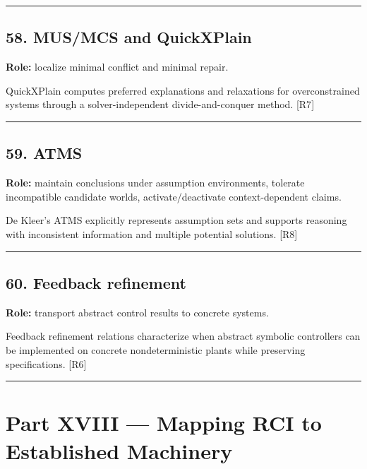 \documentclass[
]{article}
\begin{document}
\begin{center}\rule{0.5\linewidth}{0.5pt}\end{center}

\subsection{58. MUS/MCS and QuickXPlain}\label{musmcs-and-quickxplain}

\textbf{Role:} localize minimal conflict and minimal repair.

QuickXPlain computes preferred explanations and relaxations for
overconstrained systems through a solver-independent divide-and-conquer
method. {[}R7{]}

\begin{center}\rule{0.5\linewidth}{0.5pt}\end{center}

\subsection{59. ATMS}\label{atms}

\textbf{Role:} maintain conclusions under assumption environments,
tolerate incompatible candidate worlds, activate/deactivate
context-dependent claims.

De Kleer's ATMS explicitly represents assumption sets and supports
reasoning with inconsistent information and multiple potential
solutions. {[}R8{]}

\begin{center}\rule{0.5\linewidth}{0.5pt}\end{center}

\subsection{60. Feedback refinement}\label{feedback-refinement}

\textbf{Role:} transport abstract control results to concrete systems.

Feedback refinement relations characterize when abstract symbolic
controllers can be implemented on concrete nondeterministic plants while
preserving specifications. {[}R6{]}

\begin{center}\rule{0.5\linewidth}{0.5pt}\end{center}

\section{Part XVIII --- Mapping RCI to Established
Machinery}\label{part-xviii-mapping-rci-to-established-machinery}
\end{document}
